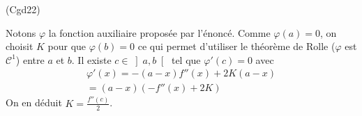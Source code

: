 \begin{tiny}(Cgd22)\end{tiny} Notons $\varphi$ la fonction auxiliaire proposée par l'énoncé. Comme $\varphi(a)=0$, on choisit $K$ pour que $\varphi(b)=0$ ce qui permet d'utiliser le théorème de Rolle ($\varphi$ est $\mathcal{C}^1$) entre $a$ et $b$. Il existe $c\in \left] a,b \right[$ tel que $\varphi'(c)=0$ avec 
\begin{multline*}
 \varphi'(x) = -(a-x)f''(x) + 2K(a-x) \\
 =(a-x)\left( -f''(x) + 2K\right) 
\end{multline*}
On en déduit $K=\frac{f''(c)}{2}$.
